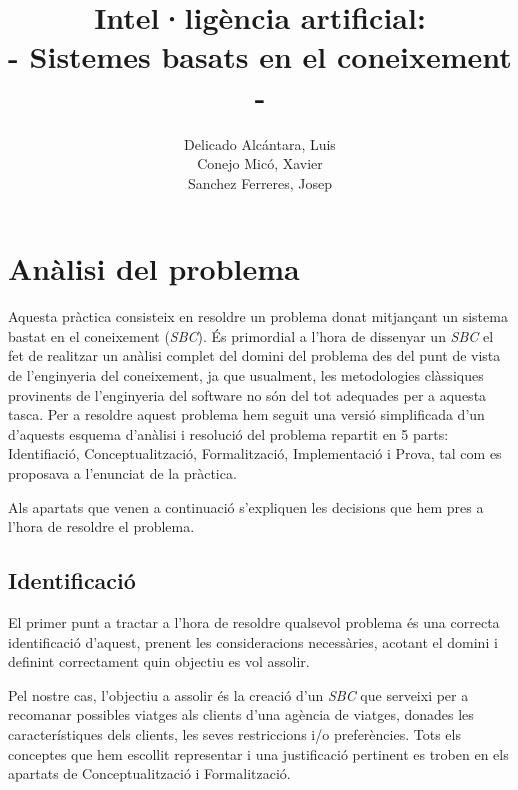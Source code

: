 \documentclass[11pt,a4paper]{article}
\author{
  Delicado Alcántara, Luis
  \\
  Conejo Micó, Xavier
  \\
  Sanchez Ferreres, Josep
}
\title{\Huge {Intel·ligència artificial:}\\ \huge{- Sistemes basats en el coneixement -}}
\begin{document}
\begin{titlepage}
\clearpage\maketitle
\thispagestyle{empty}
\end{titlepage}

\clearpage

\tableofcontents

\newpage

\section{Anàlisi del problema}
Aquesta pràctica consisteix en resoldre un problema donat mitjançant un sistema bastat en el coneixement (\emph{SBC}). És primordial a l'hora de dissenyar un \emph{SBC} el fet de realitzar un anàlisi complet del domini del problema des del punt de vista de l'enginyeria del coneixement, ja que usualment, les metodologies clàssiques provinents de l'enginyeria del software no són del tot adequades per a aquesta tasca. Per a resoldre aquest problema hem seguit una versió simplificada d'un d'aquests esquema d'anàlisi i resolució del problema repartit en 5 parts: Identifiació, Conceptualització, Formalització, Implementació i Prova, tal com es proposava a l'enunciat de la pràctica.

Als apartats que venen a continuació s'expliquen les decisions que hem pres a l'hora de resoldre el problema.

\subsection{Identificació}
El primer punt a tractar a l'hora de resoldre qualsevol problema és una correcta identificació d'aquest, prenent les consideracions necessàries, acotant el domini i definint correctament quin objectiu es vol assolir.

Pel nostre cas, l'objectiu a assolir és la creació d'un \emph{SBC} que serveixi per a recomanar possibles viatges als clients d'una agència de viatges, donades les característiques dels clients, les seves restriccions i/o preferències. Tots els conceptes que hem escollit representar i una justificació pertinent es troben en els apartats de Conceptualització i Formalització.
\end{document}
